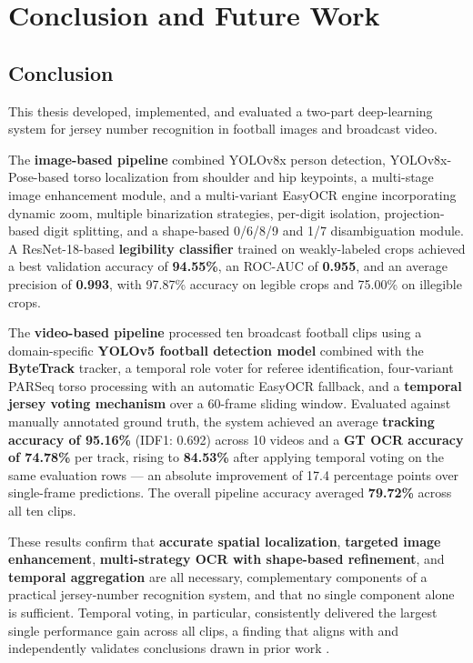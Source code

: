 \chapter{Conclusion and Future Work}
\label{ch:conclusion}

\section{Conclusion}

This thesis developed, implemented, and evaluated a two-part
deep-learning system for jersey number recognition in football images
and broadcast video.

The \textbf{image-based pipeline} combined YOLOv8x person detection,
YOLOv8x-Pose-based torso localization from shoulder and hip keypoints,
a multi-stage image enhancement module, and a multi-variant EasyOCR
engine incorporating dynamic zoom, multiple binarization strategies,
per-digit isolation, projection-based digit splitting, and a
shape-based 0/6/8/9 and 1/7 disambiguation module. A ResNet-18-based
\textbf{legibility classifier} trained on weakly-labeled crops
achieved a best validation accuracy of \textbf{94.55\%}, an ROC-AUC
of \textbf{0.955}, and an average precision of \textbf{0.993}, with
97.87\% accuracy on legible crops and 75.00\% on illegible crops.

The \textbf{video-based pipeline} processed ten broadcast football
clips using a domain-specific \textbf{YOLOv5 football detection model}
combined with the \textbf{ByteTrack} tracker, a temporal role voter for
referee identification, four-variant PARSeq torso processing with an
automatic EasyOCR fallback, and a
\textbf{temporal jersey voting mechanism} over a 60-frame sliding
window. Evaluated against manually annotated ground truth, the system
achieved an average \textbf{tracking accuracy of 95.16\%} (IDF1:
0.692) across 10 videos and a \textbf{GT OCR accuracy of 74.78\%} per
track, rising to \textbf{84.53\%} after applying temporal voting on the
same evaluation rows --- an absolute improvement of 17.4 percentage
points over single-frame predictions. The overall pipeline accuracy
averaged \textbf{79.72\%} across all ten clips.

These results confirm that \textbf{accurate spatial localization},
\textbf{targeted image enhancement}, \textbf{multi-strategy OCR with
shape-based refinement}, and \textbf{temporal aggregation} are all
necessary, complementary components of a practical jersey-number
recognition system, and that no single component alone is sufficient.
Temporal voting, in particular, consistently delivered the largest
single performance gain across all clips, a finding that aligns with
and independently validates conclusions drawn in prior work
\cite{gerke2015soccer,li2018jersey}.

